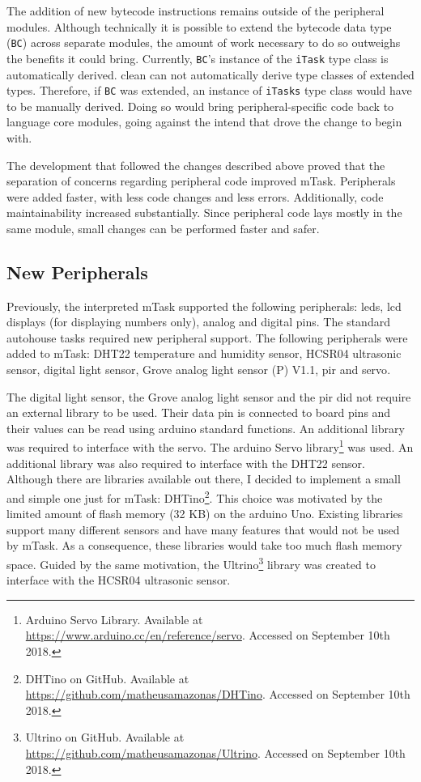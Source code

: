 The addition of new bytecode instructions remains outside of the peripheral modules. Although technically it is possible to extend the bytecode data type (\texttt{BC}) across separate modules, the amount of work necessary to do so outweighs the benefits it could bring. Currently, \texttt{BC}'s instance of the \texttt{iTask} type class is automatically derived. \gls{clean} can not automatically derive type classes of extended types. Therefore, if \texttt{BC} was extended, an instance of \texttt{iTasks} type class would have to be manually derived. Doing so would bring peripheral-specific code back to language core modules, going against the intend that drove the change to begin with.

The development that followed the changes described above proved that the separation of concerns regarding peripheral code improved \gls{mTask}. Peripherals were added faster, with less code changes and less errors. Additionally, code maintainability increased substantially. Since peripheral code lays mostly in the same module, small changes can be performed faster and safer.

\subsection{New Peripherals}\label{sec:new_peri}

Previously, the interpreted \gls{mTask} supported the following peripherals: \acsp{led}, \acs{lcd} displays (for displaying numbers only), analog and digital pins. The standard \gls{autohouse} tasks required new peripheral support. The following peripherals were added to \gls{mTask}: DHT22 temperature and humidity sensor, HCSR04 ultrasonic sensor, digital light sensor, Grove analog light sensor (P) V1.1, \ac{pir} and \gls{servo}. 

The digital light sensor, the Grove analog light sensor and the \acs{pir} did not require an external library to be used. Their data pin is connected to board pins and their values can be read using \gls{arduino} standard functions. An additional library was required to interface with the \gls{servo}. The \gls{arduino} Servo library\footnote{Arduino Servo Library. Available at \url{https://www.arduino.cc/en/reference/servo}. Accessed on September 10th 2018.} was used. An additional library was also required to interface with the DHT22 sensor. Although there are libraries available out there, I decided to implement a small and simple one just for \gls{mTask}: DHTino\footnote{DHTino on GitHub. Available at \url{https://github.com/matheusamazonas/DHTino}. Accessed on September 10th 2018.}. This choice was motivated by the limited amount of flash memory (32 KB) on the \gls{arduino} Uno. Existing libraries support many different sensors and have many features that would not be used by \gls{mTask}. As a consequence, these libraries would take too much flash memory space. Guided by the same motivation, the Ultrino\footnote{Ultrino on GitHub. Available at \url{https://github.com/matheusamazonas/Ultrino}. Accessed on September 10th 2018.} library was created to interface with the HCSR04 ultrasonic sensor.


